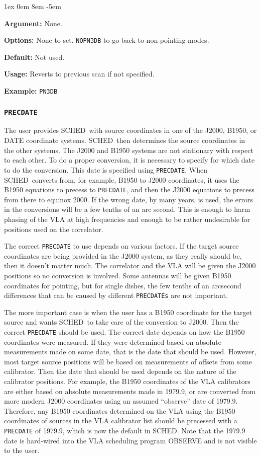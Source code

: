 \documentclass{report}
\newcommand{\sched}{{\sc SCHED}}
\newcommand{\schedb}{{\sc SCHED~}}
\newcommand{\rcwbox}[5]{
  \begin{list}{}{\parsep 1ex  \itemsep 0em
                 \leftmargin 8em  \itemindent -5em }
    \item {\bf Argument:} #1
    \item {\bf Options:}  #2
    \item {\bf Default:}  #3
    \item {\bf Usage:}    #4
    \item {\bf Example:}  #5
  \end{list}
}
\begin{document}
\rcwbox
{None.}
{None to set. {\tt NOPN3DB} to go back to non-pointing modes.}
{Not used.}
{Reverts to previous scan if not specified.}
{{\tt PN3DB}}


\subsubsection{\label{MP:PRECDATE}{\tt PRECDATE}}

The user provides \schedb with source coordinates in one of the J2000,
B1950, or DATE coordinate systems.  \schedb then determines the source
coordinates in the other systems.  The J2000 and B1950 systems are not
stationary with respect to each other.  To do a proper conversion, it
is necessary to specify for which date to do the conversion.  This
date is specified using {\tt PRECDATE}.  When \schedb converts from,
for example, B1950 to J2000 coordinates, it uses the B1950 equations
to precess to {\tt PRECDATE}, and then the J2000 equations to precess
from there to equinox 2000.  If the wrong date, by many years, is used,
the errors in the conversions will be a few tenths of an arc second.
This is enough to harm phasing of the VLA at high frequencies and
enough to be rather undesirable for positions used on the correlator.

The correct {\tt PRECDATE} to use depends on various factors.  If the
target source coordinates are being provided in the J2000 system, as
they really should be, then it doesn't matter much.  The correlator
and the VLA will be given the J2000 positions so no conversion is
involved.  Some antennas will be given B1950 coordinates for pointing,
but for single dishes, the few tenths of an arcsecond differences that
can be caused by different {\tt PRECDATEs} are not important.

The more important case is when the user has a B1950 coordinate for
the target source and wants \schedb to take care of the conversion to
J2000.  Then the correct {\tt PRECDATE} should be used.  The correct
date depends on how the B1950 coordinates were measured.  If they
were determined based on absolute measurements made on some date,
that is the date that should be used.  However, most target source
positions will be based on measurements of offsets from some
calibrator.  Then the date that should be used depends on the nature
of the calibrator positions.  For example, the B1950 coordinates
of the VLA calibrators are either based on absolute measurements
made in 1979.9, or are converted from more modern J2000 coordinates
using an assumed ``observe'' date of 1979.9.  Therefore, any B1950
coordinates determined on the VLA using the B1950 coordinates of
sources in the VLA calibrator list should be precessed with a
{\tt PRECDATE} of 1979.9, which is now the default in \sched.  Note
that the 1979.9 date is hard-wired into the VLA scheduling program
{\sc OBSERVE} and is not visible to the user.
\end{document}
